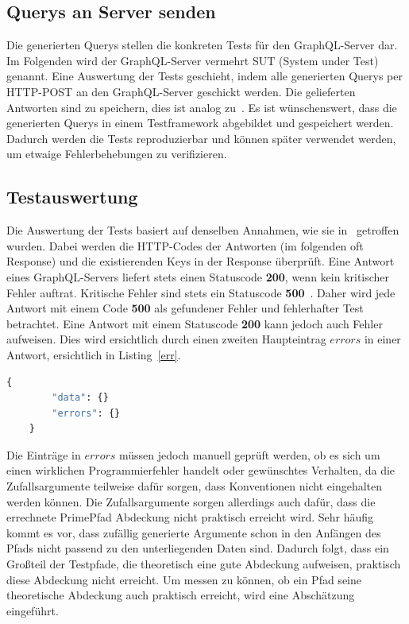 \subsection{Querys an Server senden}
\label{testf}

Die generierten Querys stellen die konkreten Tests für den GraphQL-Server dar.
Im Folgenden wird der GraphQL-Server vermehrt SUT (System under Test) genannt.
Eine Auswertung der Tests geschieht, indem alle generierten Querys per HTTP-POST an den GraphQL-Server geschickt werden.
Die gelieferten Antworten sind zu speichern, dies ist analog zu~\cite{property-based-testing}.
Es ist wünschenswert, dass die generierten Querys in einem Testframework abgebildet und gespeichert werden.
Dadurch werden die Tests reproduzierbar und können später verwendet werden, um etwaige Fehlerbehebungen zu verifizieren.

\subsection{Testauswertung}

Die Auswertung der Tests basiert auf denselben Annahmen, wie sie in~\cite{property-based-testing} getroffen wurden.
Dabei werden die HTTP-Codes der Antworten (im folgenden oft Response) und die existierenden Keys in der Response überprüft.
Eine Antwort eines GraphQL-Servers liefert stets einen Statuscode \textbf{200}, wenn kein kritischer Fehler auftrat.
Kritische Fehler sind stets ein Statuscode \textbf{500}~\cite[vgl. 7. Response]{graphqlspecification}.
Daher wird jede Antwort mit einem Code \textbf{500} als gefundener Fehler und fehlerhafter Test betrachtet.
Eine Antwort mit einem Statuscode \textbf{200} kann jedoch auch Fehler aufweisen.
Dies wird ersichtlich durch einen zweiten Haupteintrag $errors$ in einer Antwort, ersichtlich in Listing~\ref{err}.

\begin{lstlisting}[language=GraphQL, label={err}, caption={fehlerhafte Antwort}]
    {
        "data": {}
        "errors": {}
    }
\end{lstlisting}

Die Einträge in $errors$ müssen jedoch manuell geprüft werden, ob es sich um einen wirklichen Programmierfehler handelt oder gewünschtes Verhalten,
da die Zufallsargumente teilweise dafür sorgen, dass Konventionen nicht eingehalten werden können.
Die Zufallsargumente sorgen allerdings auch dafür, dass die errechnete PrimePfad Abdeckung nicht praktisch erreicht wird.
Sehr häufig kommt es vor, dass zufällig generierte Argumente schon in den Anfängen des Pfads nicht passend zu den unterliegenden Daten sind.
Dadurch folgt, dass ein Großteil der Testpfade, die theoretisch eine gute Abdeckung aufweisen, praktisch diese Abdeckung nicht erreicht.
Um messen zu können, ob ein Pfad seine theoretische Abdeckung auch praktisch erreicht, wird eine Abschätzung eingeführt.

